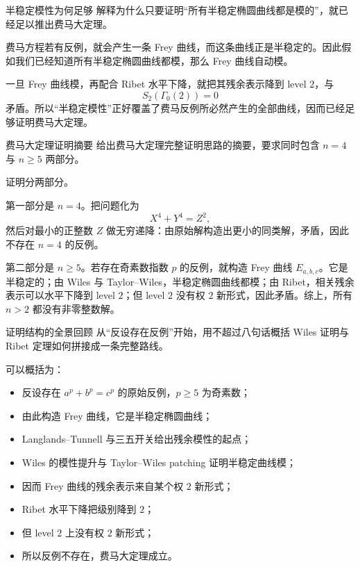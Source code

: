 \begin{problem}{半稳定模性为何足够}
\hard
解释为什么只要证明“所有半稳定椭圆曲线都是模的”，就已经足以推出费马大定理。
\end{problem}
\begin{solution}
费马方程若有反例，就会产生一条 Frey 曲线，而这条曲线正是半稳定的。因此假如我们已经知道所有半稳定椭圆曲线都模，那么 Frey 曲线自动模。

一旦 Frey 曲线模，再配合 Ribet 水平下降，就把其残余表示降到 level $2$，与
\[
S_2(\Gamma_0(2))=0
\]
矛盾。所以“半稳定模性”正好覆盖了费马反例所必然产生的全部曲线，因而已经足够证明费马大定理。
\end{solution}

\begin{problem}{费马大定理证明摘要}
\hard
给出费马大定理完整证明思路的摘要，要求同时包含 $n=4$ 与 $n\ge5$ 两部分。
\end{problem}
\begin{solution}
证明分两部分。

第一部分是 $n=4$。把问题化为
\[
X^4+Y^4=Z^2,
\]
然后对最小的正整数 $Z$ 做无穷递降：由原始解构造出更小的同类解，矛盾，因此不存在 $n=4$ 的反例。

第二部分是 $n\ge5$。若存在奇素数指数 $p$ 的反例，就构造 Frey 曲线 $E_{a,b,c}$。它是半稳定的；由 Wiles 与 Taylor--Wiles，半稳定椭圆曲线都模；由 Ribet，相关残余表示可以水平下降到 level $2$；但 level $2$ 没有权 $2$ 新形式，因此矛盾。综上，所有 $n>2$ 都没有非零整数解。
\end{solution}

\begin{problem}{证明结构的全景回顾}
\hard
从“反设存在反例”开始，用不超过八句话概括 Wiles 证明与 Ribet 定理如何拼接成一条完整路线。
\end{problem}
\begin{solution}
可以概括为：
\begin{itemize}
\item[(i)] 反设存在 $a^p+b^p=c^p$ 的原始反例，$p\ge5$ 为奇素数；
\item[(ii)] 由此构造 Frey 曲线，它是半稳定椭圆曲线；
\item[(iii)] Langlands--Tunnell 与三五开关给出残余模性的起点；
\item[(iv)] Wiles 的模性提升与 Taylor--Wiles patching 证明半稳定曲线模；
\item[(v)] 因而 Frey 曲线的残余表示来自某个权 $2$ 新形式；
\item[(vi)] Ribet 水平下降把级别降到 $2$；
\item[(vii)] 但 level $2$ 上没有权 $2$ 新形式；
\item[(viii)] 所以反例不存在，费马大定理成立。
\end{itemize}
\end{solution}
